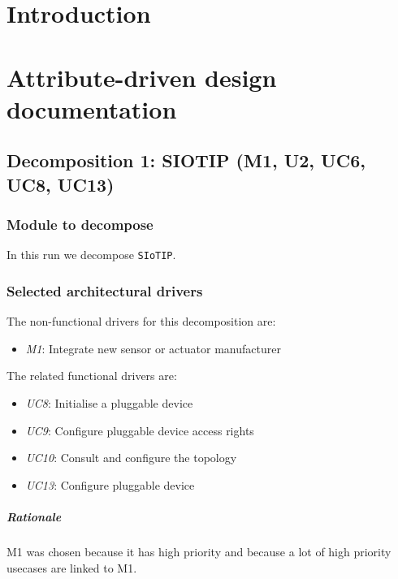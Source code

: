 \documentclass[english]{sareport}
\begin{document}
\maketitle

\tableofcontents

\chapter{Introduction}\label{sec:introduction}

\chapter{Attribute-driven design documentation}\label{sec:add}
\section{Decomposition 1: SIOTIP (M1, U2, UC6, UC8, UC13)}
\subsection{Module to decompose}
In this run we decompose \texttt{SIoTIP}.

\subsection{Selected architectural drivers}
The non-functional drivers for this decomposition are:

\begin{itemize}
	\item \emph{M1}: Integrate new sensor or actuator manufacturer
\end{itemize}

The related functional drivers are:

\begin{itemize}
	\item \emph{UC8}: Initialise a pluggable device
	\item \emph{UC9}: Configure pluggable device access rights
	\item \emph{UC10}: Consult and configure the topology
	\item \emph{UC13}: Configure pluggable device
\end{itemize}

\paragraph{Rationale}
M1 was chosen because it has high priority and because a lot of high priority usecases are linked to M1. 
\end{document}
